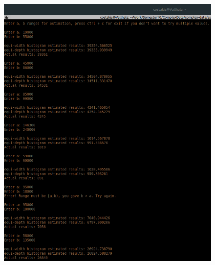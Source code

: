 \documentclass{article}[40pt]
\begin{document}
\begin{figure}[htpb!]
\includegraphics[scale=0.4]{estimations2.png}
\end{figure}
\end{document}
